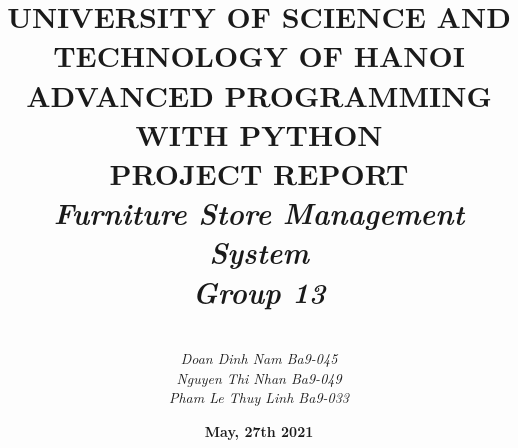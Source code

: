 \title{
\bf
UNIVERSITY OF SCIENCE AND TECHNOLOGY OF HANOI 
\\ADVANCED PROGRAMMING WITH PYTHON
\\PROJECT REPORT
\it
\\Furniture Store Management System
\vspace{1.5cm}
\bf
\\ Group 13}
\author{
\it
\\ Doan Dinh Nam Ba9-045
\it
\\Nguyen Thi Nhan Ba9-049
\it
\\Pham Le Thuy Linh Ba9-033}

\date{
\bf
May, 27th 2021}